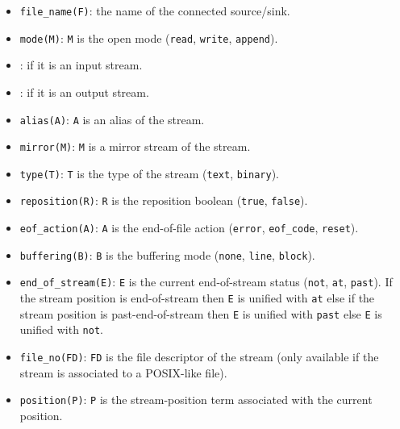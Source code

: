 \begin{itemize}

\item {}\texttt{file\_name(F)}: the name of the connected
source/sink.

\item {}\texttt{mode(M)}: \texttt{M} is the open mode (\texttt{read},
\texttt{write}, \texttt{append}).

\item {}: if it is an input stream.

\item {}: if it is an output stream.

\item {}\texttt{alias(A)}: \texttt{A} is an alias of the stream.

\item {}\texttt{mirror(M)}: \texttt{M} is a mirror stream of the
stream.

\item {}\texttt{type(T)}: \texttt{T} is the type of the stream
(\texttt{text}, \texttt{binary}).

\item {}\texttt{reposition(R)}: \texttt{R} is the reposition
boolean (\texttt{true}, \texttt{false}).

\item {}\texttt{eof\_action(A)}: \texttt{A} is the end-of-file
action (\texttt{error}, \texttt{eof\_code}, \texttt{reset}).

\item {}\texttt{buffering(B)}: \texttt{B} is the buffering mode
(\texttt{none}, \texttt{line}, \texttt{block}).

\item {}\texttt{end\_of\_stream(E)}: \texttt{E} is the
current end-of-stream status (\texttt{not}, \texttt{at}, \texttt{past}). If
the stream position is end-of-stream then \texttt{E} is unified with
\texttt{at} else if the stream position is past-end-of-stream then \texttt{E}
is unified with \texttt{past} else \texttt{E} is unified with \texttt{not}.

\item {}\texttt{file\_no(FD)}: \texttt{FD} is the file descriptor
of the stream (only available if the stream is associated to a POSIX-like file).

\item {}\texttt{position(P)}: \texttt{P} is the stream-position
term associated with the current position.

\end{itemize}


